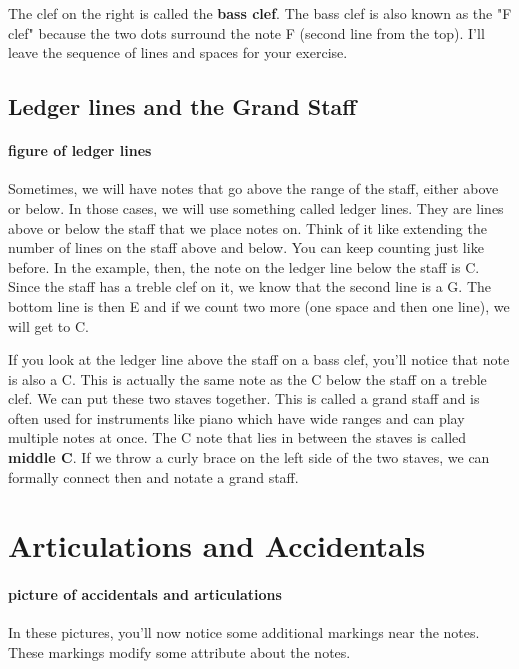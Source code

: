 \documentclass[../OpenAppliedMusicTheory.tex]{subfiles}
\begin{document}
        The clef on the right is called the \textbf{bass clef}. The bass clef is also known as the "F clef" because the two dots surround the note F (second line from the top). I'll leave the sequence of lines and spaces for your exercise.  

        \subsection{Ledger lines and the Grand Staff}
        \paragraph{figure of ledger lines}

        Sometimes, we will have notes that go above the range of the staff, either above or below. In those cases, we will use something called ledger lines. They are lines above or below the staff that we place notes on. Think of it like extending the number of lines on the staff above and below. You can keep counting just like before. In the example, then, the note on the ledger line below the staff is C. Since the staff has a treble clef on it, we know that the second line is a G. The bottom line is then E and if we count two more (one space and then one line), we will get to C. 

        If you look at the ledger line above the staff on a bass clef, you'll notice that note is also a C. This is actually the same note as the C below the staff on a treble clef. We can put these two staves together. This is called a grand staff and is often used for instruments like piano which have wide ranges and can play multiple notes at once. The C note that lies in between the staves is called \textbf{middle C}. If we throw a curly brace on the left side of the two staves, we can formally connect then and notate a grand staff.

    \section{Articulations and Accidentals}\label{ch1:markings}
        \paragraph{picture of accidentals and articulations}

        In these pictures, you'll now notice some additional markings near the notes. These markings modify some attribute about the notes. 
\end{document}

